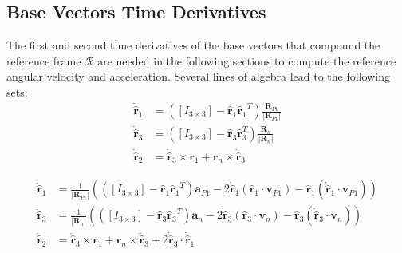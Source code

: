 \subsection{Base Vectors Time Derivatives}
The first and second time derivatives of the base vectors that compound the reference frame $\mathcal{R}$ are needed in the following sections to compute the reference angular velocity and acceleration. Several lines of algebra lead to the following sets:
\begin{subequations}
	\begin{align}
		\dot{\hat{\bm{r}}}_1 &= ([I_{3\times3}] - {\hat{\bm{r}}_1}{\hat{\bm{r}}_1}^T)  \frac{{\bm R}_{P1}} {|{\bm R}_{P1}|} \\
		\dot{\hat{\bm{r}}}_3 &= ([I_{3\times3}] - \hat{\bm{r}}_3 \hat{\bm{r}}_3^T)  \frac{{\bm R}_{n}} {|{\bm R}_{n}|} \\
		\dot{\hat{\bm{r}}}_2 &= \dot{\hat{\bm{r}}}_3 \times \bm{r}_1 +  \bm{r}_n  \times \dot{\hat{\bm{r}}}_3 
	\end{align}
\end{subequations}

\begin{subequations}
	\begin{align}
		\ddot{\hat{\bm{r}}}_1 &= \frac{1}{|{\bm R}_{P1}|}
		(
		([I_{3\times3}] - {\hat{\bm{r}}_1}{\hat{\bm{r}}_1}^T)  \bm{a}_{P1} - 
		2\dot{\hat{\bm{r}}}_1 (\hat{\bm{r}}_1 \cdot \bm{v}_{P1}) - 
		\hat{\bm{r}}_1 (\dot{\hat{\bm{r}}}_1 \cdot \bm{v}_{P1}) 
		) \\
		\ddot{\hat{\bm{r}}}_3 &= \frac{1}{|{\bm R}_{n}|}
		(
		([I_{3\times3}] - {\hat{\bm{r}}_3}{\hat{\bm{r}}_3}^T)  \bm{a}_{n} - 
		2\dot{\hat{\bm{r}}}_3 (\hat{\bm{r}}_3 \cdot \bm{v}_{n}) - 
		\hat{\bm{r}}_3 (\dot{\hat{\bm{r}}}_3 \cdot \bm{v}_{n}) 
		) \\
		\ddot{\hat{\bm{r}}}_2 &= \ddot{\hat{\bm{r}}}_3 \times \bm{r}_1 +  \bm{r}_n  \times \ddot{\hat{\bm{r}}}_3 + 2\dot{\hat{\bm{r}}}_3 \cdot \dot{\hat{\bm{r}}}_1
	\end{align}
\end{subequations}

